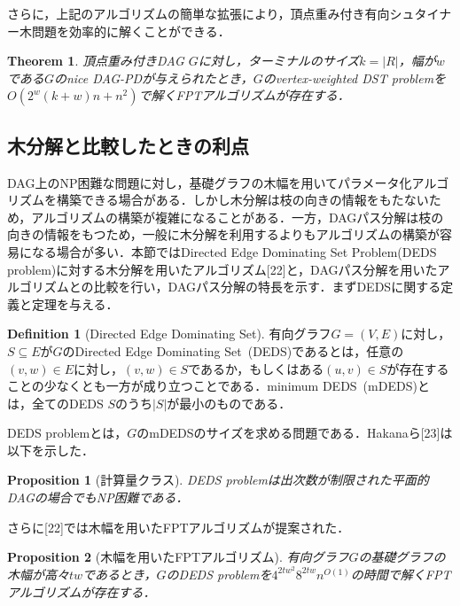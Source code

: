 \documentclass[master]{kuisthesis}		%
\theoremstyle{plain}
\newtheorem{theorem}{Theorem}
\newtheorem{proposition}{Proposition}
\theoremstyle{definition}
\newtheorem{definition*}{Definition}
\begin{document}
さらに，上記のアルゴリズムの簡単な拡張により，頂点重み付き有向シュタイナー木問題を効率的に解くことができる．

\begin{theorem}
    頂点重み付きDAG $G$に対し，ターミナルのサイズ$k=|R|$，幅が$w$である$G$のnice DAG-PDが与えられたとき，$G$のvertex-weighted DST problemを$O(2^w(k+w)n + n^2)$で解くFPTアルゴリズムが存在する．
\end{theorem}















\subsection{木分解と比較したときの利点}

DAG上のNP困難な問題に対し，基礎グラフの木幅を用いてパラメータ化アルゴリズムを構築できる場合がある．しかし木分解は枝の向きの情報をもたないため，アルゴリズムの構築が複雑になることがある．一方，DAGパス分解は枝の向きの情報をもつため，一般に木分解を利用するよりもアルゴリズムの構築が容易になる場合が多い．本節ではDirected Edge Dominating Set Problem(DEDS problem)に対する木分解を用いたアルゴリズム[22]と，DAGパス分解を用いたアルゴリズムとの比較を行い，DAGパス分解の特長を示す．まずDEDSに関する定義と定理を与える．

\begin{definition*}[Directed Edge Dominating Set]
    有向グラフ$G=(V, E)$に対し，$S \subseteq E$が$G$のDirected Edge Dominating Set\ (DEDS)であるとは，任意の$(v, w) \in E$に対し，$(v, w) \in S$であるか，もしくはある$(u, v) \in S$が存在することの少なくとも一方が成り立つことである．minimum DEDS\ (mDEDS)とは，全てのDEDS $S$のうち$|S|$が最小のものである．
\end{definition*}

DEDS problemとは，$G$のmDEDSのサイズを求める問題である．Hakanaら[23]は以下を示した．

\begin{proposition}[計算量クラス]
    DEDS problemは出次数が制限された平面的DAGの場合でもNP困難である．
\end{proposition}

さらに[22]では木幅を用いたFPTアルゴリズムが提案された．

\begin{proposition}[木幅を用いたFPTアルゴリズム]
    有向グラフ$G$の基礎グラフの木幅が高々$tw$であるとき，$G$のDEDS problemを$4^{2tw^2}8^{2tw}n^{O(1)}$の時間で解くFPTアルゴリズムが存在する．
\end{proposition}
\end{document}
